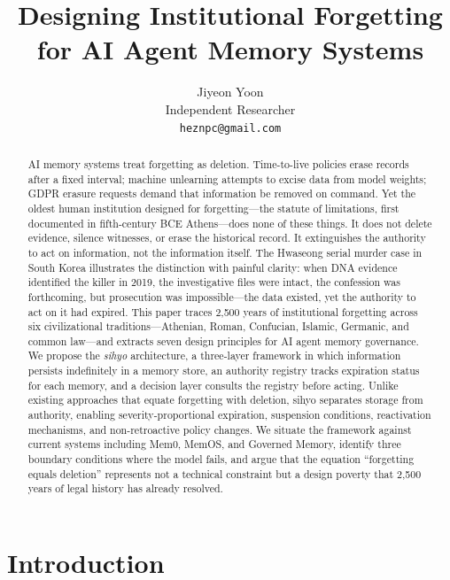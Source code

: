 \documentclass[12pt]{article}
\title{Designing Institutional Forgetting for AI Agent Memory Systems}
\author{Jiyeon Yoon\\
Independent Researcher\\
\texttt{heznpc@gmail.com}}
\date{}
\begin{document}
\maketitle

\begin{abstract}
AI memory systems treat forgetting as deletion. Time-to-live policies erase records after a fixed interval; machine unlearning attempts to excise data from model weights; GDPR erasure requests demand that information be removed on command. Yet the oldest human institution designed for forgetting---the statute of limitations, first documented in fifth-century BCE Athens---does none of these things. It does not delete evidence, silence witnesses, or erase the historical record. It extinguishes the authority to act on information, not the information itself. The Hwaseong serial murder case in South Korea illustrates the distinction with painful clarity: when DNA evidence identified the killer in 2019, the investigative files were intact, the confession was forthcoming, but prosecution was impossible---the data existed, yet the authority to act on it had expired. This paper traces 2,500 years of institutional forgetting across six civilizational traditions---Athenian, Roman, Confucian, Islamic, Germanic, and common law---and extracts seven design principles for AI agent memory governance. We propose the \emph{sihyo} architecture, a three-layer framework in which information persists indefinitely in a memory store, an authority registry tracks expiration status for each memory, and a decision layer consults the registry before acting. Unlike existing approaches that equate forgetting with deletion, sihyo separates storage from authority, enabling severity-proportional expiration, suspension conditions, reactivation mechanisms, and non-retroactive policy changes. We situate the framework against current systems including Mem0, MemOS, and Governed Memory, identify three boundary conditions where the model fails, and argue that the equation ``forgetting equals deletion'' represents not a technical constraint but a design poverty that 2,500 years of legal history has already resolved.
\end{abstract}

\section{Introduction}
\label{sec:introduction}
\end{document}
